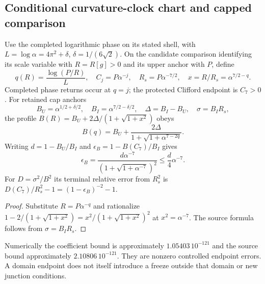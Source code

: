 \documentclass[12pt,a4paper]{article}
\begin{document}
\subsection{Conditional curvature-clock chart and capped comparison}
\label{p3d:sec:v223-cap-clock}
\begin{proposition}
\label{p3d:prop:v223-curvature-clock}
Use the completed logarithmic phase on its stated shell, with
$L=\log\alpha=4\pi^2+\delta$, $\delta=1/(6\sqrt2)$.
On the candidate comparison identifying its scale variable with
$R=R[g]>0$ and its upper anchor with $P$, define
\[
 q(R)=\frac{\log(P/R)}{L},\quad C_j=P\alpha^{-j},\quad
 R_s=P\alpha^{-7/2},\quad x=R/R_s=\alpha^{7/2-q}.
\]
Completed phase returns occur at $q=j$; the protected Clifford endpoint
is $C_7>0$.  For retained cap anchors
\[
 B_U=\alpha^{1/2+\delta/2},\quad
 B_I=\alpha^{7/2-\delta/2},\quad \Delta=B_I-B_U,
 \quad \sigma=B_IR_s,
\]
the profile $B(R)=B_U+2\Delta/(1+\sqrt{1+x^2})$ obeys
\[
 B(q)=B_U+\frac{2\Delta}{1+\sqrt{1+\alpha^{7-2q}}}.
\]
Writing $d=1-B_U/B_I$ and $\epsilon_B=1-B(C_7)/B_I$ gives
\[
 \epsilon_B=\frac{d\alpha^{-7}}{(1+\sqrt{1+\alpha^{-7}})^2}
 \le\frac d4\alpha^{-7}.
\]
For $D=\sigma^2/B^2$ its terminal relative error from $R_s^2$ is
$D(C_7)/R_s^2-1=(1-\epsilon_B)^{-2}-1$.
\end{proposition}
\begin{proof}
Substitute $R=P\alpha^{-q}$ and rationalize
$1-2/(1+\sqrt{1+x^2})=x^2/(1+\sqrt{1+x^2})^2$ at $x^2=\alpha^{-7}$.
The source formula follows from $\sigma=B_IR_s$.
\end{proof}
Numerically the coefficient bound is approximately $1.05403\,10^{-121}$
and the source bound approximately $2.10806\,10^{-121}$.  They are
nonzero controlled endpoint errors.  A domain endpoint does not itself
introduce a freeze outside that domain or new junction conditions.
\end{document}
